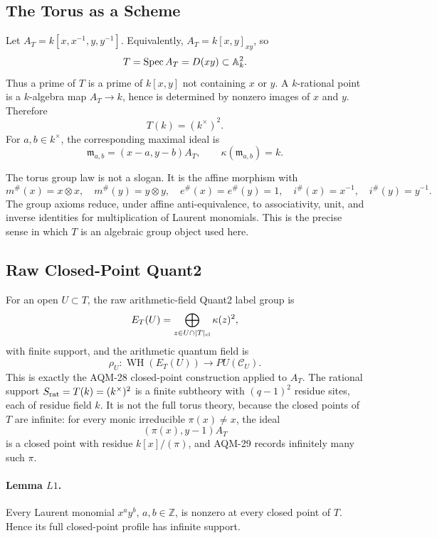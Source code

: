 \subsection{The Torus as a Scheme}

Let \(A_T=k[x,x^{-1},y,y^{-1}]\).  Equivalently, \(A_T=k[x,y]_{xy}\), so
\[
  T=\operatorname{Spec} A_T=D(xy)\subset\mathbb A^2_k.
\]
Thus a prime of \(T\) is a prime of \(k[x,y]\) not containing \(x\) or \(y\).
A \(k\)-rational point is a \(k\)-algebra map \(A_T\to k\), hence is determined
by nonzero images of \(x\) and \(y\).  Therefore
\[
  T(k)=(k^\times)^2.
\]
For \(a,b\in k^\times\), the corresponding maximal ideal is
\[
  \mathfrak m_{a,b}=(x-a,y-b)A_T,\qquad \kappa(\mathfrak m_{a,b})=k.
\]

The torus group law is not a slogan.  It is the affine morphism with
\[
  m^\#(x)=x\otimes x,\quad m^\#(y)=y\otimes y,\quad
  e^\#(x)=e^\#(y)=1,\quad i^\#(x)=x^{-1},\quad i^\#(y)=y^{-1}.
\]
The group axioms reduce, under affine anti-equivalence, to associativity,
unit, and inverse identities for multiplication of Laurent monomials.  This is
the precise sense in which \(T\) is an algebraic group object used here.

\subsection{Raw Closed-Point Quant2}

For an open \(U\subset T\), the raw arithmetic-field Quant2 label group is
\[
  E_T(U)=\bigoplus_{z\in U\cap |T|_{\rm cl}}\kappa(z)^2,
\]
with finite support, and the arithmetic quantum field is
\[
  \rho_U:\operatorname{WH}(E_T(U))\longrightarrow PU(\mathcal C_U).
\]
This is exactly the AQM-28 closed-point construction applied to \(A_T\).
The rational support \(S_{\rm rat}=T(k)=(k^\times)^2\) is a finite subtheory
with \((q-1)^2\) residue sites, each of residue field \(k\).  It is not the full torus theory, because the closed points of
\(T\) are infinite: for every monic irreducible \(\pi(x)\ne x\), the ideal
\[
  (\pi(x),y-1)A_T
\]
is a closed point with residue \(k[x]/(\pi)\), and AQM-29 records infinitely
many such \(\pi\).

\paragraph{Lemma \(L1\).}
Every Laurent monomial \(x^ay^b\), \(a,b\in\mathbb Z\), is nonzero at every
closed point of \(T\).  Hence its full closed-point profile has infinite
support.

